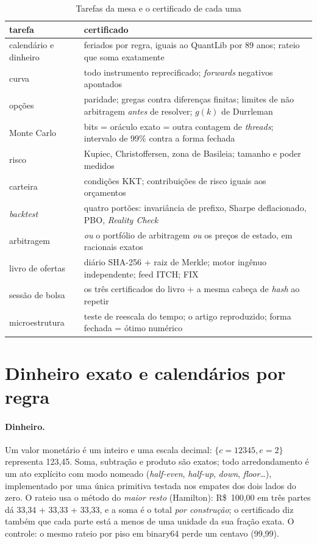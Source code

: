\begin{table}[htbp]
\centering
\caption{Tarefas da mesa e o certificado de cada uma}\label{tab:fin-tarefas}
\small
\begin{tabularx}{\textwidth}{@{}lX@{}}
\toprule
\textbf{tarefa} & \textbf{certificado}\\
\midrule
calendário e dinheiro & feriados por regra, iguais ao QuantLib por 89 anos; rateio que soma exatamente\\
curva & todo instrumento reprecificado; \textit{forwards} negativos apontados\\
opções & paridade; gregas contra diferenças finitas; limites de não arbitragem \emph{antes} de resolver; $g(k)$ de Durrleman\\
Monte Carlo & bits = oráculo exato = outra contagem de \textit{threads}; intervalo de 99\% contra a forma fechada\\
risco & Kupiec, Christoffersen, zona de Basileia; tamanho e poder medidos\\
carteira & condições KKT; contribuições de risco iguais aos orçamentos\\
\textit{backtest} & quatro portões: invariância de prefixo, Sharpe deflacionado, PBO, \textit{Reality Check}\\
arbitragem & \emph{ou} o portfólio de arbitragem \emph{ou} os preços de estado, em racionais exatos\\
livro de ofertas & diário SHA-256 + raiz de Merkle; motor ingênuo independente; feed ITCH; FIX\\
sessão de bolsa & os três certificados do livro + a mesma cabeça de \textit{hash} ao repetir\\
microestrutura & teste de reescala do tempo; o artigo reproduzido; forma fechada = ótimo numérico\\
\bottomrule
\end{tabularx}
\end{table}

\section{Dinheiro exato e calendários por regra}\label{sec:fin-dinheiro}

\paragraph{Dinheiro.} Um valor monetário é um inteiro e uma escala decimal: $\{c = 12345, e = 2\}$ representa 123,45. Soma, subtração e produto são exatos; todo arredondamento é um ato explícito com modo nomeado (\textit{half-even}, \textit{half-up}, \textit{down}, \textit{floor}\ldots), implementado por uma única primitiva testada nos empates dos dois lados do zero. O rateio usa o método do \emph{maior resto} (Hamilton): R\$~100,00 em três partes dá 33,34 + 33,33 + 33,33, e a soma é o total \emph{por construção}; o certificado diz também que cada parte está a menos de uma unidade da sua fração exata. O controle: o mesmo rateio por piso em binary64 perde um centavo (99,99).

